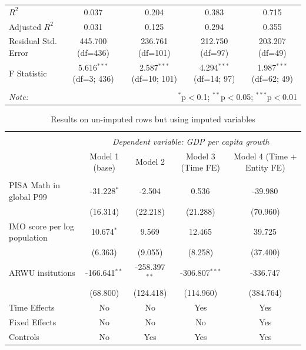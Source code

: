 \documentclass[11pt]{article}
\begin{document}
\begin{table}[H]
{\begin{tabular}{@{\extracolsep{5pt}}lcccc}
     $R^2$ & 0.037 & 0.204 & 0.383 & 0.715 \\
     Adjusted $R^2$ & 0.031 & 0.125 & 0.294 & 0.355 \\
     Residual Std. Error & 445.700 (df=436) & 236.761 (df=101) & 212.750 (df=97) & 203.207 (df=49) \\
     F Statistic & 5.616$^{***}$ (df=3; 436) & 2.587$^{***}$ (df=10; 101) & 4.294$^{***}$ (df=14; 97) & 1.987$^{***}$ (df=62; 49) \\
    \hline
    \hline \\[-1.8ex]
    \textit{Note:} & \multicolumn{4}{r}{$^{*}$p$<$0.1; $^{**}$p$<$0.05; $^{***}$p$<$0.01} \\
    \end{tabular}
    }
\end{table}

\begin{table}[!htbp] \centering
    \caption{Results on un-imputed rows but using imputed variables}
    \label{table:reg-impute}
    \resizebox{\linewidth}{!} {
    \begin{tabular}{@{\extracolsep{5pt}}lcccc}
    \\[-1.8ex]\hline
    \hline \\[-1.8ex]
    & \multicolumn{4}{c}{\textit{Dependent variable: GDP per capita growth}} \
    \cr \cline{2-5}
    \\[-1.8ex] & \multicolumn{1}{c}{Model 1 (base)} & \multicolumn{1}{c}{Model 2} & \multicolumn{1}{c}{Model 3 (Time FE)} & \multicolumn{1}{c}{Model 4 (Time + Entity FE)}  \\
    \hline \\[-1.8ex]
     PISA Math in global P99 & -31.228$^{*}$ & -2.504$^{}$ & 0.536$^{}$ & -39.980$^{}$ \\
    & (16.314) & (22.218) & (21.288) & (70.960) \\
     IMO score per log population & 10.674$^{*}$ & 9.569$^{}$ & 12.465$^{}$ & 39.725$^{}$ \\
    & (6.363) & (9.055) & (8.258) & (37.400) \\
     ARWU insitutions & -166.641$^{**}$ & -258.397$^{**}$ & -306.807$^{***}$ & -336.747$^{}$ \\
    & (68.800) & (124.418) & (114.960) & (384.764) \\
     Time Effects & No & No & Yes & Yes \\
     Fixed Effects & No & No & No & Yes \\
     Controls & No & Yes & Yes & Yes \\

\end{tabular}}
\end{table}
\end{document}

